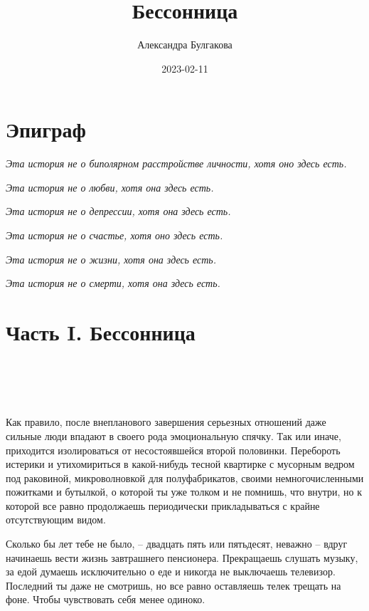 \documentclass[
]{book}
\title{Бессонница}
\author{Александра Булгакова}
\date{2023-02-11}
\begin{document}
\maketitle

{
\setcounter{tocdepth}{1}
\tableofcontents
}
\hypertarget{ux44dux43fux438ux433ux440ux430ux444}{%
\chapter*{Эпиграф}\label{ux44dux43fux438ux433ux440ux430ux444}}

\emph{Эта история не о биполярном расстройстве личности, хотя оно здесь есть.}

\emph{Эта история не о любви, хотя она здесь есть.}

\emph{Эта история не о депрессии, хотя она здесь есть.}

\emph{Эта история не о счастье, хотя оно здесь есть.}

\emph{Эта история не о жизни, хотя она здесь есть.}

\emph{Эта история не о смерти, хотя она здесь есть.}

\hypertarget{ux447ux430ux441ux442ux44c-i.-ux431ux435ux441ux441ux43eux43dux43dux438ux446ux430}{%
\chapter*{Часть I. Бессонница}\label{ux447ux430ux441ux442ux44c-i.-ux431ux435ux441ux441ux43eux43dux43dux438ux446ux430}}

\hypertarget{chapter-1}{%
\chapter{~}\label{chapter-1}}

Как правило, после внепланового завершения серьезных отношений даже сильные люди впадают в своего рода эмоциональную спячку. Так или иначе, приходится изолироваться от несостоявшейся второй половинки. Перебороть истерики и утихомириться в какой-нибудь тесной квартирке с мусорным ведром под раковиной, микроволновкой для полуфабрикатов, своими немногочисленными пожитками и бутылкой, о которой ты уже толком и не помнишь, что внутри, но к которой все равно продолжаешь периодически прикладываться с крайне отсутствующим видом.

Сколько бы лет тебе не было, -- двадцать пять или пятьдесят, неважно -- вдруг начинаешь вести жизнь завтрашнего пенсионера. Прекращаешь слушать музыку, за едой думаешь исключительно о еде и никогда не выключаешь телевизор. Последний ты даже не смотришь, но все равно оставляешь телек трещать на фоне. Чтобы чувствовать себя менее одиноко.
\end{document}
